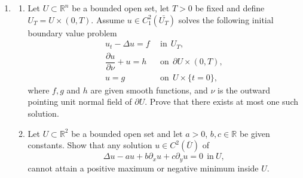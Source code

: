 \documentclass[11pt,reqno]{amsart}
\newcommand{\R}{\mathbb{R}}
\newcommand{\<}{\langle}
\renewcommand{\>}{\rangle}
\begin{document}
\begin{enumerate}[label={\arabic*.}]
\newpage
\item
\begin{tcolorbox}
\begin{enumerate}[leftmargin=*]
\item Let $U\subset \R^n$ be a bounded open set, let $T>0$ be fixed and define $U_T = U \times (0, T)$. Assume $u\in C_1^2(\bar{U_T})$ solves the following initial boundary value problem
\begin{align}
u_t - \Delta u = f\ \  & \text{in} \ \ U_T,\\
\dfrac{\partial u}{\partial \nu} + u = h \ \ & \text{on}\ \  \partial U \times (0, T),\\
u=g \ \ & \text{on}\ \ U\times \{t=0\},
\end{align}
where $f, g$ and $h$ are given smooth functions, and $\nu$ is the outward pointing unit normal field of $\partial U$. Prove that there exists at most one such solution.
\item Let $U\subset \R^2$ be a bounded open set and let $a>0$, $b,c\in \R$ be given constants. Show that any solution $u\in C^2(\bar{U})$ of
\begin{equation*}
\Delta u -au + b\partial_x u + c\partial_y u = 0 \ \ \text{in} \ U,
\end{equation*}
cannot attain a positive maximum or negative minimum inside $U$.
\end{enumerate}
\end{tcolorbox}
\bigskip



\end{enumerate}
\end{document}
